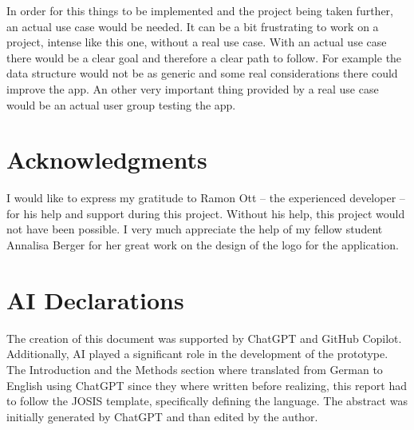 \documentclass{josis}
\begin{document}
In order for this things to be implemented and the project being taken further, an actual use case would be needed.
It can be a bit frustrating to work on a project, intense like this one, without a real use case.
With an actual use case there would be a clear goal and therefore a clear path to follow. For example the
data structure would not be as generic and some real considerations there could improve the app.
An other very important thing provided by a real use case would be an actual user group testing the app.

\section*{Acknowledgments}

I would like to express my gratitude to Ramon Ott -- the experienced developer -- for his help and support during this project. 
Without his help, this project would not have been possible.
I very much appreciate the help of my fellow student Annalisa Berger for her great work on the design of the logo for the application.

\section*{AI Declarations}

The creation of this document was supported by ChatGPT and GitHub Copilot. 
Additionally, AI played a significant role in the development of the prototype.
The Introduction and the Methods section where translated from German to English using
ChatGPT since they where written before realizing, this report had to follow the JOSIS template,
specifically defining the language. The abstract was initially generated by ChatGPT
and than edited by the author.



\end{document}
